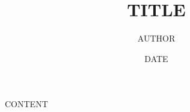 \documentclass[UTF8,9pt,twocolumn]{article}
\begin{document}
\title{{{TITLE}}}
\author{{{AUTHOR}}}
\date{{{DATE}}}
\maketitle

{{{CONTENT}}}
\end{document}
